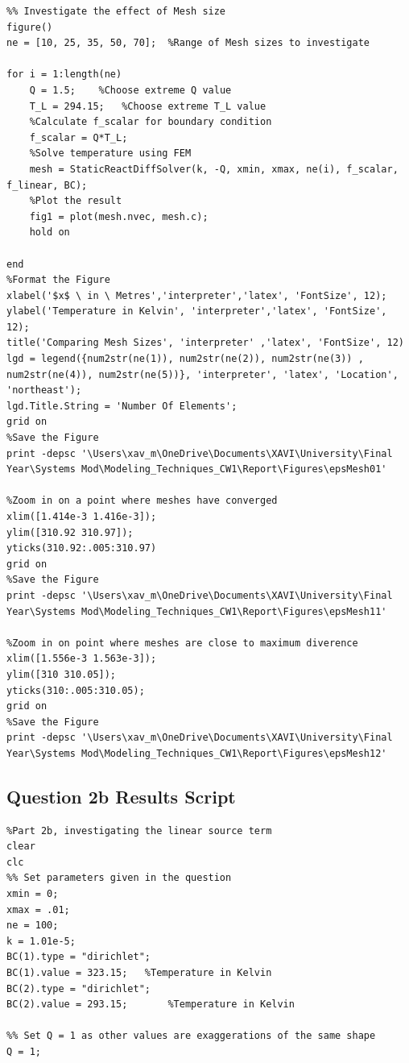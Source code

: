 \documentclass[11pt]{article}
\begin{document}
\begin{appendices}
\begin{lstlisting}
%% Investigate the effect of Mesh size
figure()
ne = [10, 25, 35, 50, 70];  %Range of Mesh sizes to investigate

for i = 1:length(ne)
    Q = 1.5;    %Choose extreme Q value
    T_L = 294.15;   %Choose extreme T_L value
    %Calculate f_scalar for boundary condition
    f_scalar = Q*T_L;
    %Solve temperature using FEM
    mesh = StaticReactDiffSolver(k, -Q, xmin, xmax, ne(i), f_scalar, f_linear, BC);
    %Plot the result
    fig1 = plot(mesh.nvec, mesh.c);
    hold on
    
end
%Format the Figure
xlabel('$x$ \ in \ Metres','interpreter','latex', 'FontSize', 12);
ylabel('Temperature in Kelvin', 'interpreter','latex', 'FontSize', 12);
title('Comparing Mesh Sizes', 'interpreter' ,'latex', 'FontSize', 12)
lgd = legend({num2str(ne(1)), num2str(ne(2)), num2str(ne(3)) , num2str(ne(4)), num2str(ne(5))}, 'interpreter', 'latex', 'Location', 'northeast');
lgd.Title.String = 'Number Of Elements';
grid on 
%Save the Figure
print -depsc '\Users\xav_m\OneDrive\Documents\XAVI\University\Final Year\Systems Mod\Modeling_Techniques_CW1\Report\Figures\epsMesh01'

%Zoom in on a point where meshes have converged
xlim([1.414e-3 1.416e-3]);
ylim([310.92 310.97]);
yticks(310.92:.005:310.97)
grid on 
%Save the Figure
print -depsc '\Users\xav_m\OneDrive\Documents\XAVI\University\Final Year\Systems Mod\Modeling_Techniques_CW1\Report\Figures\epsMesh11'

%Zoom in on point where meshes are close to maximum diverence
xlim([1.556e-3 1.563e-3]);
ylim([310 310.05]);
yticks(310:.005:310.05);
grid on 
%Save the Figure
print -depsc '\Users\xav_m\OneDrive\Documents\XAVI\University\Final Year\Systems Mod\Modeling_Techniques_CW1\Report\Figures\epsMesh12'

\end{lstlisting}
\clearpage
\subsection{Question 2b Results Script}\label{ap:Q2b}
\begin{lstlisting}
%Part 2b, investigating the linear source term
clear
clc
%% Set parameters given in the question
xmin = 0;
xmax = .01;
ne = 100;
k = 1.01e-5;
BC(1).type = "dirichlet";
BC(1).value = 323.15;   %Temperature in Kelvin
BC(2).type = "dirichlet";
BC(2).value = 293.15;       %Temperature in Kelvin

%% Set Q = 1 as other values are exaggerations of the same shape
Q = 1;


\end{lstlisting}
\end{appendices}
\end{document}
